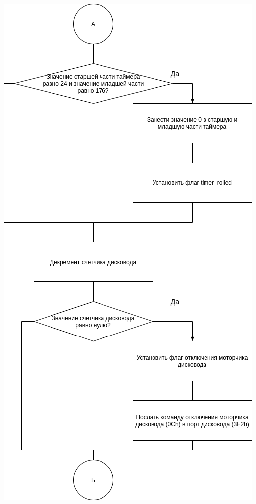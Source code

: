     \begin{center}
      \includegraphics[scale=0.6]{images/scheme-int8h_2.drawio.png}
    \end{center}
    
